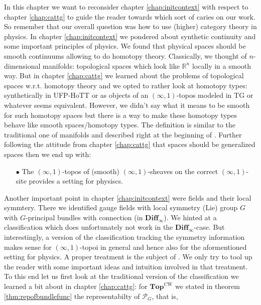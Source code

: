 In this chapter we want to reconsider chapter \ref{chap:initcontext} with respect to chapter \ref{chap:cattg} to guide the reader towards \cite{a565d200} which sort of caries on our work. So remember that our overall question was how to use (higher) category theory in physics. In chapter \ref{chap:initcontext} we pondered about synthetic continuity and some important principles of physics. We found that physical spaces should be smooth continuums allowing to do homotopy theory. Classically, we thought of $n$-dimensional manifolds: topological spaces which look like $\mathbb{R}^{n}$ locally in a smooth way. But in chapter \ref{chap:cattg} we learned about the problems of topological spaces w.r.t. homotopy theory and we opted to rather look at homotopy types: synthetically in UFP-HoTT or as objects of an $(\infty,1)$-topos modeled in TG or whatever seems equivalent. However, we didn't say what it means to be {\glqq}smooth{\grqq} for such homotopy spaces but there is a way to make these homotopy types behave like smooth spaces/homotopy types. The definition is similar to the traditional one of manifolds and described right at the beginning of \cite{a565d200}. Further following the attitude from chapter \ref{chap:cattg} that spaces should be generalized spaces then we end up with:
\begin{enumerate}
\item[$\bullet$]
The $(\infty,1)$-topos of (smooth) $(\infty,1)$-sheaves on the {\glqq}correct{\grqq} $(\infty,1)$-site provides a setting for physiscs.
\end{enumerate}
Another important point in chapter \ref{chap:initcontext} were fields and their local symmtery. There we identified {\glqq}gauge fields with local symmetry (Lie) group $G${\grqq} with {\glqq}$G$-principal bundles with connection (in $\mathbf{Diff}_{\infty}$){\grqq}. We hinted at a classification which does unfortunately not work in the $\mathbf{Diff}_{\infty}$-case. But interestingly, a version of the classification tracking the symmetry information makes sense for $(\infty,1)$-topoi in general and hence also for the aformentioned setting for physics. A proper treatment is the subject of \cite{a565d200}. We only try to tool up the reader with some important ideas and intuition involved in that treatment. To this end let us first look at the traditional version of the classification we learned a bit about in chapter \ref{chap:cattg}: for $\mathbf{Top}^{\textrm{CW}}$ we stated in theorem \ref{thm:repofbundlefunc} the representabilty of $\mathcal{P}_{G}$, that is,

